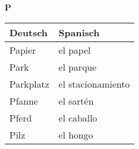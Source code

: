 \begin{flushright}\begin{Huge}\textbf{P}\end{Huge}\end{flushright}

\begin{longtable}{p{} p{}} 
\textbf{Deutsch}     & \textbf{Spanisch}                                       \\ \hline
\hline
\endhead %
Papier & el papel \\
Park & el parque \\
Parkplatz & el stacionamiento \\
Pfanne & el sartén\\
Pferd & el caballo\\
Pilz & el hongo\\

\end{longtable}
